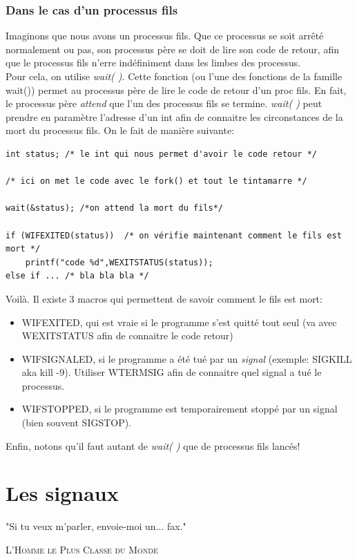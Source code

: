 \documentclass{report}
\begin{document}
\subsection{Dans le cas d'un processus fils}
Imaginons que nous avons un processus fils. Que ce processus se soit arrêté normalement ou pas, son processus père se doit de lire son code de retour, afin que le processus fils n'erre indéfiniment dans les limbes des processus.\\
Pour cela, on utilise \emph{wait( )}. Cette fonction (ou l'une des fonctions de la famille wait()) permet au processus père de lire le code de retour d'un proc fils. En fait, le processus père \emph{attend} que l'un des processus fils se termine. \emph{wait( )} peut prendre en paramètre l'adresse d'un int afin de connaitre les circonstances de la mort du processus fils. On le fait de manière suivante:
\begin{lstlisting}
int status; /* le int qui nous permet d'avoir le code retour */

/* ici on met le code avec le fork() et tout le tintamarre */

wait(&status); /*on attend la mort du fils*/

if (WIFEXITED(status))	/* on vérifie maintenant comment le fils est mort */
	printf("code %d",WEXITSTATUS(status));
else if ... /* bla bla bla */

\end{lstlisting}
Voilà. Il existe 3 macros qui permettent de savoir comment le fils est mort:
\begin{itemize}
\item \textsc{WIFEXITED}, qui est vraie si le programme s'est quitté tout seul (va avec \textsc{WEXITSTATUS} afin de connaitre le code retour)
\item \textsc{WIFSIGNALED}, si le programme a été tué par un \emph{signal} (exemple: SIGKILL aka kill -9). Utiliser \textsc{WTERMSIG} afin de connaitre quel signal a tué le processus.
\item \textsc{WIFSTOPPED}, si le programme est temporairement stoppé par un signal (bien souvent SIGSTOP).
\end{itemize}
Enfin, notons qu'il faut autant de \emph{wait( )} que de processus fils lancés!




\chapter{Les signaux}
\epigraph{"Si tu veux m'parler, envoie-moi un... fax."}{\textsc{L'Homme le Plus Classe du Monde}}
\end{document}
